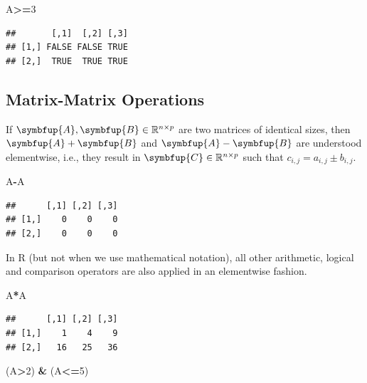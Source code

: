 \documentclass[10pt,b5paper,krantz1]{krantz}
\newenvironment{Shaded}{\begin{snugshade}}{\end{snugshade}}
\newcommand{\DecValTok}[1]{\textcolor[rgb]{0.06,0.06,0.06}{#1}}
\newcommand{\NormalTok}[1]{#1}
\newcommand{\OperatorTok}[1]{\textcolor[rgb]{0.43,0.43,0.43}{\textbf{#1}}}
\newcommand{\StringTok}[1]{\textcolor[rgb]{0.5,0.5,0.5}{#1}}
\renewcommand{\mathbf}[1]{\symbfup{#1}}
\begin{document}
\begin{Shaded}
\begin{Highlighting}[]
\NormalTok{A}\OperatorTok{>=}\DecValTok{3}
\end{Highlighting}
\end{Shaded}

\begin{verbatim}
##       [,1]  [,2] [,3]
## [1,] FALSE FALSE TRUE
## [2,]  TRUE  TRUE TRUE
\end{verbatim}

\hypertarget{matrix-matrix-operations}{%
\subsection{Matrix-Matrix Operations}\label{matrix-matrix-operations}}

If \(\mathbf{A},\mathbf{B}\in\mathbb{R}^{n\times p}\)
are two matrices of identical sizes, then
\(\mathbf{A}+\mathbf{B}\) and
\(\mathbf{A}-\mathbf{B}\) are understood elementwise,
i.e., they result in \(\mathbf{C}\in\mathbb{R}^{n\times p}\)
such that \(c_{i,j}=a_{i,j}\pm b_{i,j}\).

\begin{Shaded}
\begin{Highlighting}[]
\NormalTok{A}\OperatorTok{-}\NormalTok{A}
\end{Highlighting}
\end{Shaded}

\begin{verbatim}
##      [,1] [,2] [,3]
## [1,]    0    0    0
## [2,]    0    0    0
\end{verbatim}

In R (but not when we use mathematical notation),
all other arithmetic, logical and comparison operators are also
applied in an elementwise fashion.

\begin{Shaded}
\begin{Highlighting}[]
\NormalTok{A}\OperatorTok{*}\NormalTok{A}
\end{Highlighting}
\end{Shaded}

\begin{verbatim}
##      [,1] [,2] [,3]
## [1,]    1    4    9
## [2,]   16   25   36
\end{verbatim}

\begin{Shaded}
\begin{Highlighting}[]
\NormalTok{(A}\OperatorTok{>}\DecValTok{2}\NormalTok{) }\OperatorTok{&}\StringTok{ }\NormalTok{(A}\OperatorTok{<=}\DecValTok{5}\NormalTok{)}
\end{Highlighting}
\end{Shaded}
\end{document}

